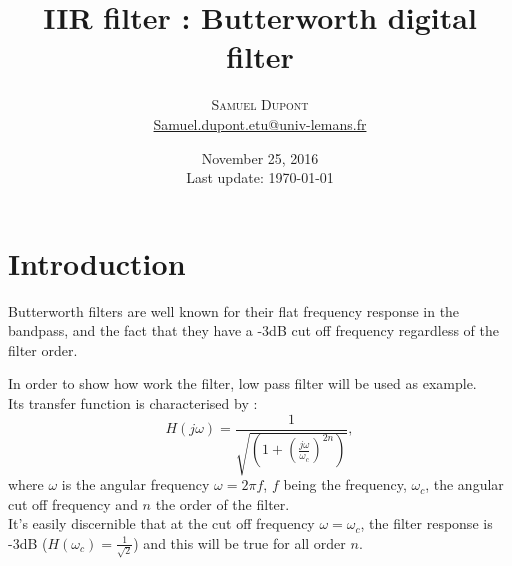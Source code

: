 \documentclass[twoside,twocolumn]{article}
\title{IIR filter : Butterworth digital filter  } %
\author{%
\textsc{Samuel Dupont}\\ %
\normalsize \href{mailto:Samuel.dupont.etu@univ-lemans.fr}{Samuel.dupont.etu@univ-lemans.fr } 
}
\date{November 25, 2016 \\ Last update: \today}
\begin{document}
\maketitle


\section{Introduction}
Butterworth filters are well known for their flat frequency response in the bandpass, and the fact that they  have a -3dB cut off frequency regardless of the filter order.

In order to show how work the filter, low pass filter will be used as example.\\
Its transfer function is characterised by :
\begin{equation}
H(j\omega)=\frac{1}{\sqrt{(1 + (\frac{j	\omega}{\omega_c})^{2n} )}},
\end{equation}
where $\omega$ is the angular frequency $\omega = 2 \pi f$, $f$ being the frequency, $\omega_c$, the angular cut off frequency and $n$ the order of the filter.\\
It's easily discernible that at the cut off frequency $\omega=\omega_c$, the filter response is -3dB ($H(\omega_c)=\frac{1}{\sqrt{2}}$) and this will be true for all order $n$.
\end{document}
